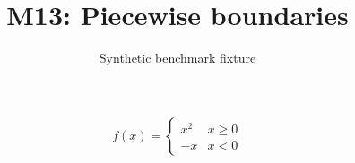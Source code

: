 \documentclass{article}
\title{M13: Piecewise boundaries}
\author{Synthetic benchmark fixture}
\date{}
\begin{document}
\maketitle
\[f(x)=\begin{cases}x^2&x\geq 0\\-x&x<0\end{cases}\]
\end{document}
